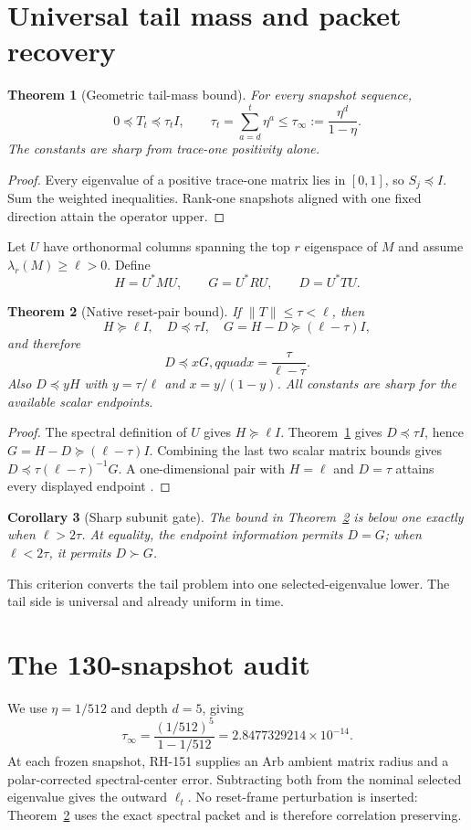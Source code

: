 \documentclass[12pt]{article}
\newtheorem{theorem}{Theorem}
\newtheorem{corollary}[theorem]{Corollary}
\begin{document}
\section{Universal tail mass and packet recovery}
\begin{theorem}[Geometric tail-mass bound]\label{thm:mass}
For every snapshot sequence,
\[
 0\preceq T_t\preceq\tau_t I,
 \qquad
 \tau_t=\sum_{a=d}^{t}\eta^a
 \leq\tau_\infty:=\frac{\eta^d}{1-\eta}.
\]
The constants are sharp from trace-one positivity alone.
\end{theorem}
\begin{proof}
Every eigenvalue of a positive trace-one matrix lies in $[0,1]$, so
$S_j\preceq I$.  Sum the weighted inequalities.  Rank-one snapshots aligned
with one fixed direction attain the operator upper.
\end{proof}

Let $U$ have orthonormal columns spanning the top $r$ eigenspace of $M$ and
assume $\lambda_r(M)\geq\ell>0$.  Define
\[
 H=U^*MU,\qquad G=U^*RU,\qquad D=U^*TU.
\]

\begin{theorem}[Native reset-pair bound]\label{thm:pair}
If $\|T\|\leq\tau<\ell$, then
\[
 H\succeq\ell I,\quad D\preceq\tau I,\quad
 G=H-D\succeq(\ell-\tau)I,
\]
and therefore
\[
 D\preceq xG,qquad x=\frac{\tau}{\ell-\tau}.
\]
Also $D\preceq yH$ with $y=\tau/\ell$ and $x=y/(1-y)$.
All constants are sharp for the available scalar endpoints.
\end{theorem}
\begin{proof}
The spectral definition of $U$ gives $H\succeq\ell I$.
Theorem~\ref{thm:mass} gives $D\preceq\tau I$, hence
$G=H-D\succeq(\ell-\tau)I$.  Combining the last two scalar matrix bounds
gives $D\preceq\tau(\ell-\tau)^{-1}G$.  A one-dimensional pair with
$H=\ell$ and $D=\tau$ attains every displayed endpoint
\citep{Bhatia1997,HornJohnson2013}.
\end{proof}

\begin{corollary}[Sharp subunit gate]\label{cor:gate}
The bound in Theorem~\ref{thm:pair} is below one exactly when
$\ell>2\tau$.  At equality, the endpoint information permits $D=G$; when
$\ell<2\tau$, it permits $D\succ G$.
\end{corollary}

This criterion converts the tail problem into one selected-eigenvalue lower.
The tail side is universal and already uniform in time.

\section{The 130-snapshot audit}
We use $\eta=1/512$ and depth $d=5$, giving
\[
 \tau_\infty=\frac{(1/512)^5}{1-1/512}
 =2.8477329214\times10^{-14}.
\]
At each frozen snapshot, RH-151 supplies an Arb ambient matrix radius and a
polar-corrected spectral-center error.  Subtracting both from the nominal
selected eigenvalue gives the outward $\ell_t$.  No reset-frame perturbation
is inserted: Theorem~\ref{thm:pair} uses the exact spectral packet and is
therefore correlation preserving.
\end{document}

